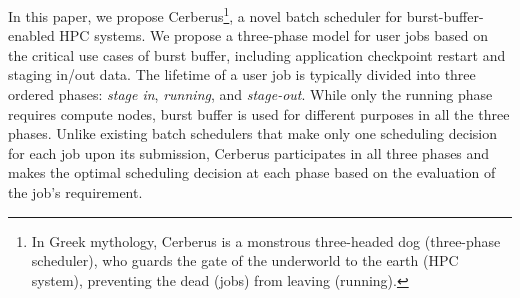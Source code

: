 In this paper, we propose Cerberus\footnote{In Greek mythology,
Cerberus is a monstrous three-headed dog (three-phase scheduler),
who guards the gate of the underworld to the earth (HPC system),
preventing the dead (jobs) from leaving (running).},
a novel batch scheduler for burst-buffer-enabled HPC systems. 
We propose a three-phase model for user jobs based on the critical use cases of burst buffer, including
application checkpoint restart and staging in/out data. 
The lifetime of a user job is typically divided into three ordered phases:
\textit{stage in}, \textit{running}, and \textit{stage-out}.
While only the running phase requires compute nodes, burst buffer is used for different
purposes in all the three phases.
Unlike existing batch schedulers that make only one scheduling decision for each job upon its submission,
Cerberus participates in all three phases and makes the optimal scheduling decision
at each phase based on the evaluation of the job's requirement.

